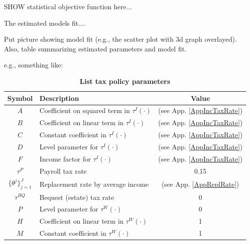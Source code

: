 \documentclass[letterpaper,12pt]{article}
\theoremstyle{definition}
\begin{document}
\begin{spacing}{1.5}
SHOW statistical objective function here...

The estimated models fit....

Put picture showing model fit (e.g., the scatter plot with 3d graph overlayed).  Also, table summarizing estimated parameters and model fit.





e.g., something like:

    \begin{table}[htbp] \centering \captionsetup{width=4.7in}
    \caption{\label{TaxParams}\textbf{List tax policy parameters}}
      \begin{threeparttable}
      \begin{tabular}{>{\footnotesize}c |>{\footnotesize}l |>{\footnotesize}c}
        \hline\hline
        Symbol & \quad\quad\quad\quad Description & Value \\
        \hline
        $A$ & Coefficient on squared term in $\tau^I(\cdot)$ & (see App. \ref{AppIncTaxRate}) \\
        $B$ & Coefficient on linear term in $\tau^I(\cdot)$ & (see App. \ref{AppIncTaxRate}) \\
        $C$ & Constant coefficient in $\tau^I(\cdot)$ & (see App. \ref{AppIncTaxRate}) \\
        $D$ & Level parameter for $\tau^I(\cdot)$ & (see App. \ref{AppIncTaxRate}) \\
        $F$ & Income factor for $\tau^I(\cdot)$ & (see App. \ref{AppIncTaxRate}) \\
        $\tau^P$ & Payroll tax rate & 0.15 \\
        $\{\theta^j\}_{j=1}^J$ & Replacement rate by average income & (see App. \ref{AppReplRate}) \\
        $\tau^{BQ}$ & Bequest (estate) tax rate & 0 \\
        $P$ & Level parameter for $\tau^W(\cdot)$ & 0 \\
        $H$ & Coefficient on linear term in $\tau^W(\cdot)$ & 1 \\
        $M$ & Constant coefficient in $\tau^W(\cdot)$ & 1 \\
        \hline\hline
      \end{tabular}
      \end{threeparttable}
    \end{table}


\end{spacing}
\end{document}
